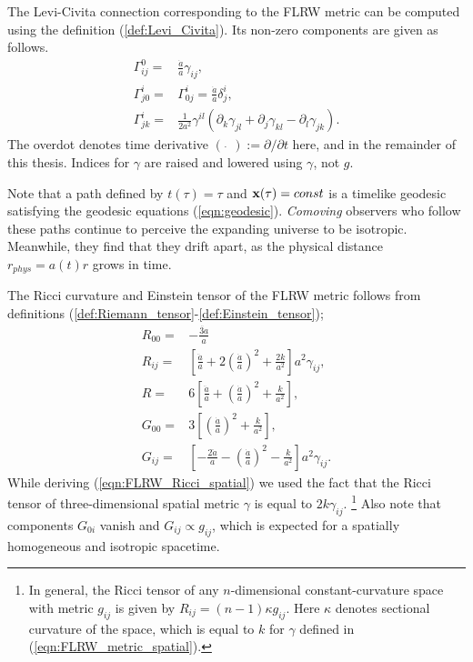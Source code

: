 The Levi-Civita connection corresponding to the FLRW metric can be computed using the definition (\ref{def:Levi_Civita}). Its non-zero components are given as follows.
\begin{align}
	\Gamma^0_{ij} =& \frac{\dot{a}}{a} \gamma_{ij}, \label{eqn:homogenous_christoffel_1}\\
	\Gamma^i_{j0} =& \Gamma^i_{0j} = \frac{\dot{a}}{a} \delta^i_j, \label{eqn:homogenous_christoffel_2}\\
	\Gamma^i_{jk} =& \frac{1}{2a^2} \gamma^{il} \left( \partial_k \gamma_{jl} + \partial_j \gamma_{kl} - \partial_l \gamma_{jk} \right).  \label{eqn:homogenous_christoffel_3}
\end{align}
The overdot denotes time derivative $(\,\, \dot{} \,\,) := \partial/\partial t$ here, and in the remainder of this thesis. Indices for $\gamma$ are raised and lowered using $\gamma$, not $g$.

Note that a path defined by $t(\tau)=\tau$ and $\mathbf{x}(\tau)=const$ is a timelike geodesic satisfying the geodesic equations (\ref{eqn:geodesic}). \textit{Comoving} observers who follow these paths continue to perceive the expanding universe to be isotropic. Meanwhile, they find that they drift apart, as the physical distance $r_{phys} = a(t) r$ grows in time.

The Ricci curvature and Einstein tensor of the FLRW metric follows from definitions (\ref{def:Riemann_tensor}-\ref{def:Einstein_tensor});
\begin{align}
	R_{00} =& - \frac{\ddot{3a}}{a} \\
	R_{ij} =& \left[ \frac{\ddot{a}}{a} + 2 \left( \frac{\dot{a}}{a} \right)^2 + \frac{2k}{a^2} \right] a^2 \gamma_{ij}, \label{eqn:FLRW_Ricci_spatial}\\
	R =& 6 \left[ \frac{\ddot{a}}{a} + \left( \frac{\dot{a}}{a} \right)^2 + \frac{k}{a^2} \right], \\
	G_{00} =& 3 \left[ \left( \frac{\dot{a}}{a} \right)^2 + \frac{k}{a^2} \right], \label{eqn:Einstein_tensor_FLRW_00} \\
	G_{ij} =& \left[ - \frac{2\ddot{a}}{a} - \left( \frac{\dot{a}}{a} \right)^2 - \frac{k}{a^2} \right] a^2 \gamma_{ij}. \label{eqn:Einstein_tensor_FLRW_ij}
\end{align}
While deriving (\ref{eqn:FLRW_Ricci_spatial}) we used the fact that the Ricci tensor of three-dimensional spatial metric $\gamma$ is equal to $2k\gamma_{ij}$. \footnote{In general, the Ricci tensor of any $n$-dimensional constant-curvature space with metric $g_{ij}$ is given by $R_{ij} = (n-1)\kappa g_{ij}$. Here $\kappa$ denotes sectional curvature of the space, which is equal to $k$ for $\gamma$ defined in (\ref{eqn:FLRW_metric_spatial}).} Also note that components $G_{0i}$ vanish and $G_{ij} \propto g_{ij}$, which is expected for a spatially homogeneous and isotropic spacetime.


